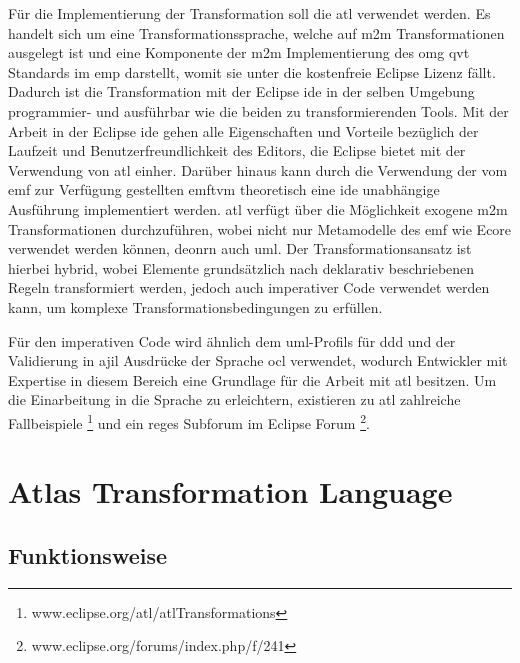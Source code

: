 \documentclass[
	oneside,  %
	ngerman, 
	final, 
	11pt, 
	a4paper, 
	1.1headlines, 
	headinclude=false, 
	footinclude=false, 
	mpinclude=false, 
	pagesize, 
	onecolumn, 
	titlepage, 
	parskip=half, 
	headsepline, 
	chapterprefix=false, 
	version=first, 
	listof=totoc, 
	bibliography=totoc, 
	toc=graduated, 
	fleqn
]{scrbook}
\begin{document}
Für die Implementierung der Transformation soll die \ac{atl} verwendet werden. Es handelt sich um eine Transformationssprache, welche auf \ac{m2m} Transformationen ausgelegt ist und eine Komponente der \ac{m2m} Implementierung des \ac{omg} \ac{qvt} Standards im \ac{emp} darstellt, womit sie unter die kostenfreie Eclipse Lizenz fällt. Dadurch ist die Transformation mit der Eclipse \ac{ide} in der selben Umgebung programmier- und ausführbar wie die beiden zu transformierenden Tools. Mit der Arbeit in der Eclipse \ac{ide} gehen alle Eigenschaften und Vorteile bezüglich der Laufzeit und Benutzerfreundlichkeit des Editors, die Eclipse bietet mit der Verwendung von \ac{atl} einher. Darüber hinaus kann durch die Verwendung der vom  \ac{emf} zur Verfügung gestellten \ac{emftvm} theoretisch eine \ac{ide} unabhängige Ausführung implementiert werden. \ac{atl} verfügt über die Möglichkeit exogene \ac{m2m} Transformationen durchzuführen, wobei nicht nur Metamodelle des \ac{emf} wie Ecore verwendet werden können, deonrn auch \ac{uml}. Der Transformationsansatz ist hierbei hybrid, wobei Elemente grundsätzlich nach deklarativ beschriebenen Regeln transformiert werden, jedoch auch imperativer Code verwendet werden kann, um komplexe Transformationsbedingungen zu erfüllen. \cite{ATLDoc}

Für den imperativen Code wird ähnlich dem \ac{uml}-Profils für \ac{ddd} und der Validierung in \ac{ajil} Ausdrücke der Sprache \ac{ocl} verwendet, wodurch Entwickler mit Expertise in diesem Bereich eine Grundlage für die Arbeit mit \ac{atl} besitzen. Um die Einarbeitung in die Sprache zu erleichtern, existieren zu \ac{atl} zahlreiche Fallbeispiele \footnote{www.eclipse.org/atl/atlTransformations} und ein reges Subforum im Eclipse Forum \footnote{www.eclipse.org/forums/index.php/f/241}.


\section{Atlas Transformation Language}
\subsection{Funktionsweise}
\end{document}
